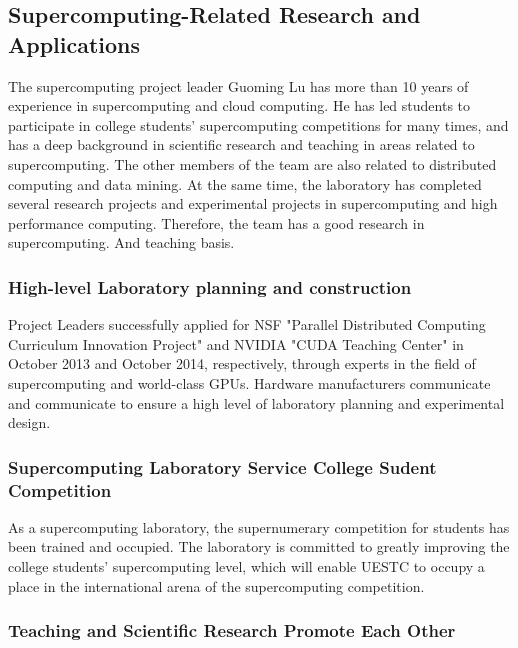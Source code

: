 \documentclass{mcmthesis}
\begin{document}
\subsection{Supercomputing-Related Research and Applications} 
\par The supercomputing project leader Guoming Lu has more than 10 years of experience in supercomputing and cloud computing. He has led students to participate in college students' supercomputing competitions for many times, and has a deep background in scientific research and teaching in areas related to supercomputing. The other members of the team are also related to distributed computing and data mining. At the same time, the laboratory has completed several research projects and experimental projects in supercomputing and high performance computing. Therefore, the team has a good research in supercomputing. And teaching basis.

\subsubsection{High-level Laboratory planning and construction}

\par Project Leaders successfully applied for NSF "Parallel Distributed Computing Curriculum Innovation Project" and NVIDIA "CUDA Teaching Center" in October 2013 and October 2014, respectively, through experts in the field of supercomputing and world-class GPUs. Hardware manufacturers communicate and communicate to ensure a high level of laboratory planning and experimental design.

\subsubsection{Supercomputing Laboratory Service College Sudent Competition}

\par As a supercomputing laboratory, the supernumerary competition for students has been trained and occupied. The laboratory is committed to greatly improving the college students' supercomputing level, which will enable UESTC to occupy a place in the international arena of the supercomputing competition.

\subsubsection{Teaching and Scientific Research Promote Each Other}
\end{document}
